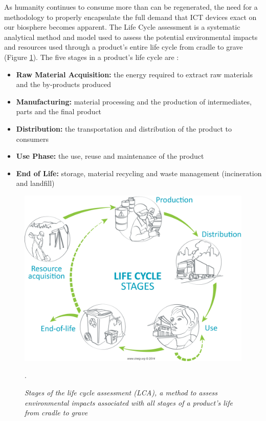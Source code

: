 \documentclass{article}
\begin{document}
As humanity continues to consume more than can be regenerated, the need for a methodology to properly encapsulate the full demand that ICT devices exact on our biosphere becomes apparent. The Life Cycle assessment is a systematic analytical method and model used to assess the potential environmental impacts and resources used through a product's entire life cycle from cradle to grave (Figure \ref{LCA_Stages}). The five stages in a product's life cycle are  \cite{finnveden2009recent, guinee2000life, andrae2015life}:
\begin{itemize}
    \item \textbf{Raw Material Acquisition:} the energy required to extract raw materials and the by-products produced
    \item \textbf{Manufacturing:} material processing and the production of %
    intermediates, parts and the final product
    \item \textbf{Distribution:} the transportation and distribution of the product to consumers
    \item \textbf{Use Phase:} the use, reuse and maintenance of the product
    \item \textbf{End of Life:} storage, material recycling and waste management (incineration and landfill)
\end{itemize}

\begin{figure}[h]
    \includegraphics[width=.8 \textwidth]{./images/LCA_Stages1.png}
    \centering
    \caption{\textit{Stages of the life cycle assessment (LCA), a method to assess environmental impacts associated with all stages of a product's life from cradle to grave} \cite{ciraig2020LCA}}.
    \label{LCA_Stages}
\end{figure}
\end{document}
